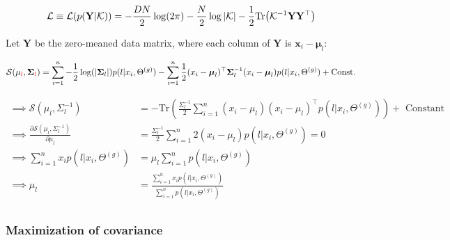 \documentclass{article}
\def\x{{\mathbf x}}
\def\L{{\cal L}}
\def\C{\text{Const.}}
\def\tr{\text{tr}}
\def\Y{{\bf Y}}
\def\K{{\bf K}}
\def\tr{\text{Tr}}
\def\SIGMA{{\boldsymbol \Sigma}}
\def\MU{\boldsymbol {\mu }}
\def\K{{\mathcal{K}}}
\def\Y{{\mathbf Y}}
\begin{document}
\begin{equation}
\begin{split}
\L \equiv \L(p(\Y| \K)) &= - \frac{D N }{2} \log(2 \pi)  - \frac{N}{2} \log | \K | - \frac{1}{2}  \tr \big( \K^{-1} \Y {\Y}^\top \big)\\
\end{split}
\end{equation}


Let $\Y$ be the zero-meaned data matrix, where each {\color{blue} column} of $\Y$ is $\x_i - \MU_l$:

\begin{equation}
\begin{split}
\mathcal{S}(\mu_{\color{red} l},  \SIGMA_{\color{red} l})
&=   \sum_{i=1}^{n}  -\frac{1}{2} \log ( | \SIGMA_l | ) p(l|x_i,\Theta^{(g)})  -  \sum_{i=1}^{n}  \frac{1}{2}  ( x_i - \MU_l)^\top \SIGMA_l^{-1} (x_i - \MU_l)  p(l|x_i,\Theta^{(g)}) + \C\\
\end{split}
\end{equation}



\begin{equation}
\begin{split}
\implies \mathcal{S}(\mu_l, \Sigma_l^{-1})  &=   - \tr \left( \frac{\Sigma_l^{-1}}{2} \sum_{i=1}^{n}  ( x_i - \mu_l)  (x_i - \mu_l)^\top p(l|x_i,\Theta^{(g)})   \right)   + \text{ Constant} \\
\implies  \frac{\partial \mathcal{S}(\mu_l, \Sigma_l^{-1})}{\partial \mu_l} &=   \frac{\Sigma_l^{-1} }{2} \sum_{i=1}^{n}   2  ( x_i - \mu_l) p(l|x_i,\Theta^{(g)}) = 0\\
\implies  \sum_{i=1}^{n}  x_i  p(l|x_i,\Theta^{(g)})  &= \mu_l  \sum_{i=1}^{n}  p(l|x_i,\Theta^{(g)})   \\
\implies   \mu_l &=  \frac{ \sum_{i=1}^{n}  x_i  p(l|x_i,\Theta^{(g)})} { \sum_{i=1}^{n}  p(l|x_i,\Theta^{(g)}) }  \\
\end{split}
\end{equation}









\subsubsection{Maximization of covariance}
\end{document}
